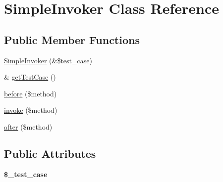 \hypertarget{class_simple_invoker}{
\section{SimpleInvoker Class Reference}
\label{class_simple_invoker}
}
\subsection*{Public Member Functions}
\begin{DoxyCompactItemize}
\item 
\hyperlink{class_simple_invoker_a332d48492641f23d71ced8da77e0cc48}{SimpleInvoker} (\&\$test\_\-case)
\item 
\& \hyperlink{class_simple_invoker_a7f50cb5c6078448f33da8cbfa9c04b4a}{getTestCase} ()
\item 
\hyperlink{class_simple_invoker_acf9fb37462a5c7b73fd5a7ebbe6974dd}{before} (\$method)
\item 
\hyperlink{class_simple_invoker_a9e26c2b57c77dd61f8eb26760aab0c32}{invoke} (\$method)
\item 
\hyperlink{class_simple_invoker_a65e6a4f996ecc4ae9d015a528b5188c3}{after} (\$method)
\end{DoxyCompactItemize}
\subsection*{Public Attributes}
\begin{DoxyCompactItemize}
\item 
\hypertarget{class_simple_invoker_a84d178937cac9c95d4471005c356df80}{
{\bfseries \$\_\-test\_\-case}}
\label{class_simple_invoker_a84d178937cac9c95d4471005c356df80}

\end{DoxyCompactItemize}


